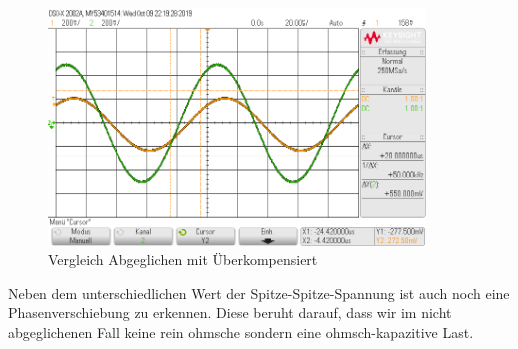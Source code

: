 \documentclass[a4paper,12pt]{article}
\begin{document}
	\begin{figure}[h]
		\centering
		\includegraphics[width=10cm]{img/Phasenverschiebung}
		\caption{Vergleich Abgeglichen mit Überkompensiert}
	\end{figure}
	\newline
	Neben dem unterschiedlichen Wert der Spitze-Spitze-Spannung ist auch noch eine Phasenverschiebung zu erkennen. Diese beruht darauf, dass wir im nicht abgeglichenen Fall keine rein ohmsche sondern eine ohmsch-kapazitive Last.
	\newpage
\end{document}
